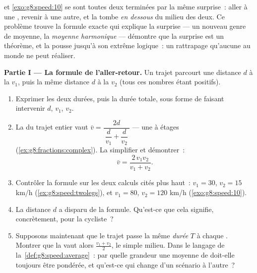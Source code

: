 \begin{problem}
\label{pb:g8:speed:1}
 et \cref{exo:g8:speed:10} se sont toutes
deux terminées par la même surprise~: aller à une , revenir à
une autre, et la  tombe \emph{en dessous} du milieu
des deux. Ce problème trouve la formule exacte qui explique la
surprise --- un nouveau genre de moyenne, la \emph{moyenne
harmonique} --- démontre que la surprise
est un théorème, et la pousse jusqu'à son extrême logique~: un
rattrapage qu'aucune  au monde ne peut réaliser.

\medskip
\noindent\textbf{Partie I --- La formule de l'aller-retour.}
Un trajet parcourt une distance $d$ à la  $v_1$, puis la même
distance $d$ à la  $v_2$ (tous ces nombres étant positifs).
\begin{enumerate}
  \item Exprimer les deux durées, puis la durée totale, sous forme
        de  faisant intervenir $d$, $v_1$, $v_2$.
  \item La  du trajet entier vaut
        $\bar v = \dfrac{2d}{\ \dfrac{d}{v_1} + \dfrac{d}{v_2}\ }$
        --- une  à étages
        (\cref{ex:g8:fractions:complex}). La simplifier et
        démontrer~:
        \[
        \bar v = \frac{2\, v_1 v_2}{v_1 + v_2} .
        \]
  \item Contrôler la formule sur les deux calculs cités plus haut~:
        $v_1 = 30$, $v_2 = 15$ km/h
        (\cref{ex:g8:speed:twolegs}), et $v_1 = 80$,
        $v_2 = 120$ km/h (\cref{exo:g8:speed:10}).
  \item La distance $d$ a disparu de la formule. Qu'est-ce que cela
        signifie, concrètement, pour la cycliste~?
  \item Supposons maintenant que le trajet passe la même
        \emph{durée} $T$ à chaque . Montrer que la  vaut alors $\frac{v_1 + v_2}{2}$, le simple milieu.
        Dans le langage de la~\cref{def:g8:speed:average}~: par quelle
        grandeur une moyenne de  doit-elle toujours être
        pondérée, et qu'est-ce qui change d'un scénario à l'autre~?
\end{enumerate}


\end{problem}
